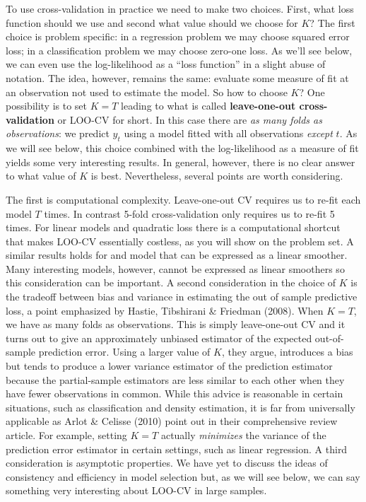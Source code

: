 To use cross-validation in practice we need to make two choices.
First, what loss function should we use and second what value should we choose for $K$?
The first choice is problem specific: in a regression problem we may choose squared error loss; in a classification problem we may choose zero-one loss.
As we'll see below, we can even use the log-likelihood as a ``loss function'' in a slight abuse of notation.
The idea, however, remains the same: evaluate some measure of fit at an observation not used to estimate the model.
So how to choose $K$?
One possibility is to set $K = T$ leading to what is called \textbf{leave-one-out cross-validation} or LOO-CV for short.
In this case there are \emph{as many folds as observations}: we predict $y_t$ using a model fitted with all observations \emph{except} $t$.
As we will see below, this choice combined with the log-likelihood as a measure of fit yields some very interesting results.
In general, however, there is no clear answer to what value of $K$ is best.
Nevertheless, several points are worth considering.

The first is computational complexity. 
Leave-one-out CV requires us to re-fit each model $T$ times. 
In contrast 5-fold cross-validation only requires us to re-fit 5 times. 
For linear models and quadratic loss there is a computational shortcut that makes LOO-CV essentially costless, as you will show on the problem set.
A similar results holds for and model that can be expressed as a linear smoother.
Many interesting models, however, cannot be expressed as linear smoothers so this consideration can be important. 
A second consideration in the choice of $K$ is the tradeoff between bias and variance in estimating the out of sample predictive loss, a point emphasized by Hastie, Tibshirani \& Friedman (2008).
When $K = T$, we have as many folds as observations. 
This is simply leave-one-out CV and it turns out to give an approximately unbiased estimator of the expected out-of-sample prediction error. 
Using a larger value of $K$, they argue, introduces a bias but tends to produce a lower variance estimator of the prediction estimator because the partial-sample estimators are less similar to each other when they have fewer observations in common.
While this advice is reasonable in certain situations, such as classification and density estimation, it is far from universally applicable as Arlot \& Celisse (2010) point out in their comprehensive review article.
For example, setting $K=T$ actually \emph{minimizes} the variance of the prediction error estimator in certain settings, such as linear regression.
A third consideration is asymptotic properties. 
We have yet to discuss the ideas of consistency and efficiency in model selection but, as we will see below, we can say something very interesting about LOO-CV in large samples. 

